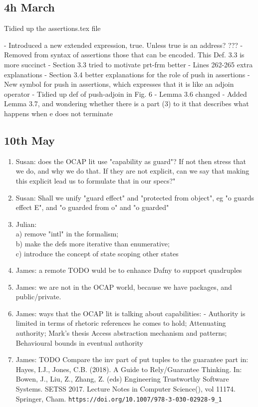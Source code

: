 \documentclass[acmsmall,review,anonymous]{acmart}\settopmatter{printfolios=true}
\begin{document}
\subsection*{4h March}

Tidied up the assertions.tex file

- Introduced a new extended expression, true. Unless true is an address? ???
- Removed from syntax of assertions those that can be encoded. This Def. 3.3 is more succinct 
- Section 3.3 tried to motivate prt-frm better 
- Lines 262-265 extra explanations 
- Section 3.4 better explanations for the role of push in assertions 
- New symbol for push in assertions, which expresses that it is like an adjoin operator
- Tidied up def of push-adjoin in Fig. 6
- Lemma 3.6 changed
- Added Lemma 3.7, and wondering whether there is a part (3) to it that describes what happens when e does not terminate



\subsection*{10th May}

\begin{enumerate}
\item
Susan: does the OCAP lit use "capability as guard"? If not then stress that we do, and why we do that. If they are not explicit, can we say that making this explicit lead us to formulate that in our specs?"
\item
Susan: Shall we unify "guard effect" and "protected from object", eg "o guards effect E", and "o guarded from o" and "o guarded"
\item
Julian: \\
a) remove "intl" in the formalism; \\
b) make the defs more iterative than enumerative;\\
c) introduce the concept of state scoping other states
\item
James: a remote TODO wuld be to enhance Dafny to support quadruples
\item
James: we are not in the OCAP world, because we have packages, and public/private. 
\item
James: ways that the OCAP lit is talking about capabilities: - Authority is limited in terms of rhetoric references he comes to hold;  Attenuating authority; Mark’s thesis Access abstraction mechanism and patterns; Behavioural bounds in eventual authority
\item
James: TODO Compare the inv part of put tuples to the guarantee part in: Hayes, I.J., Jones, C.B. (2018). A Guide to Rely/Guarantee Thinking. In: Bowen, J., Liu, Z., Zhang, Z. (eds) Engineering Trustworthy Software Systems. SETSS 2017. Lecture Notes in Computer Science(), vol 11174. Springer, Cham. \texttt{https://doi.org/10.1007/978-3-030-02928-9\_1}
\end{enumerate}
\end{document}

